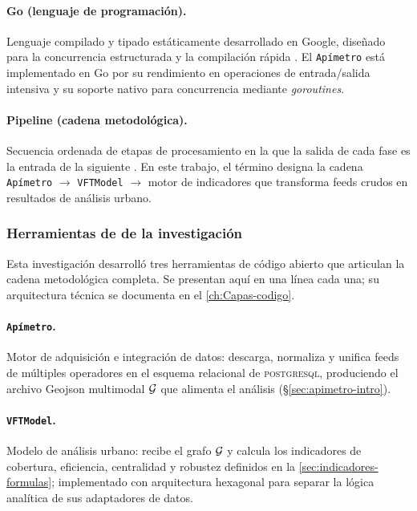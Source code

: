 \paragraph{Go (lenguaje de programación).}
Lenguaje compilado y tipado estáticamente desarrollado en Google, diseñado para
la concurrencia estructurada y la compilación rápida \citep{go2024spec}. El
\texttt{Apímetro} está implementado en Go por su rendimiento en operaciones de
entrada/salida intensiva y su soporte nativo para concurrencia mediante
\textit{goroutines}.

\paragraph{Pipeline (cadena metodológica).}
Secuencia ordenada de etapas de procesamiento en la que la salida de cada fase
es la entrada de la siguiente \citep{ramakrishnan2003}. En este trabajo, el
término designa la cadena \texttt{Apímetro} $\to$ \texttt{VFTModel} $\to$ motor de indicadores que
transforma feeds \gtfs{} crudos en resultados de análisis urbano.

\subsubsection*{Herramientas de \texorpdfstring{}{software} de la investigación}
\label{subsubsec:glosario-herramientas}

Esta investigación desarrolló tres herramientas de código abierto que articulan
la cadena metodológica completa. Se presentan aquí en una línea cada una; su
arquitectura técnica se documenta en el \autoref{ch:Capas-codigo}.

\paragraph{\texorpdfstring{\texttt{Apímetro}}{Apímetro}.}
Motor de adquisición e integración de datos: descarga, normaliza y unifica feeds
\gtfs{} de múltiples operadores en el esquema relacional de \textsc{postgresql},
produciendo el archivo Geojson multimodal $\mathcal{G}$ que alimenta el análisis
(§\ref{sec:apimetro-intro}).

\paragraph{\texorpdfstring{\texttt{VFTModel}}{VFTModel}.}
Modelo de análisis urbano: recibe el grafo $\mathcal{G}$ y calcula los indicadores de
cobertura, eficiencia, centralidad y robustez definidos en la
\autoref{sec:indicadores-formulas}; implementado con arquitectura hexagonal para
separar la lógica analítica de sus adaptadores de datos.

